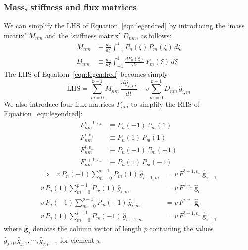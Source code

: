 \documentclass[10pt,a4paper]{article}
\begin{document}
\subsubsection{Mass, stiffness and flux matrices}

We can simplify the LHS of Equation~\ref{eqn:legendred} by introducing the `mass
matrix' $M_{nm}$ and the `stiffness matrix' $D_{nm}$, as follows:
\begin{align*}
M_{nm} & \equiv \frac{dz}{d\xi} \int_{-1}^{1} P_n(\xi) \, P_m(\xi) \, d\xi \\
D_{nm} & \equiv \frac{dz}{d\xi} \int_{-1}^{1} \frac{dP_n(\xi)}{dz} \, P_m(\xi) \, d\xi
\end{align*}
The LHS of Equation~\ref{eqn:legendred} becomes simply
\[
\mbox{LHS} = \sum_{m=0}^{p-1} M_{nm} \, \frac{d\hat{g}_{i,m}}{dt} - v \sum_{m=0}^{p-1}
D_{nm} \, \hat{g}_{i,m}
\]
We also introduce four flux matrices $F_{nm}$ to simplify the RHS
of Equation~\ref{eqn:legendred}:
\begin{align*}
F_{nm}^{i-1,v_+} & \equiv P_n(-1) \, P_m(1) \\
F_{nm}^{i,v_+} & \equiv P_n(1) \, P_m(1) \\
F_{nm}^{i,v_-} & \equiv P_n(-1) \, P_m(-1) \\
F_{nm}^{i+1,v_-} & \equiv P_n(1) \, P_m(-1)
\end{align*}
\begin{align*}
\Longrightarrow \;\;\;
v \, P_n(-1) \sum_{m=0}^{p-1} P_m(1) \, \hat{g}_{i-1,m} & = v \, F^{i-1,v_+} \,
\hat{\mathbf{g}}_{i-1} \\
v \, P_n(1) \sum_{m=0}^{p-1} P_m(1) \, \hat{g}_{i,m} & = v \, F^{i,v_+} \,
\hat{\mathbf{g}}_{i} \\
v \, P_n(-1) \sum_{m=0}^{p-1} P_m(-1) \, \hat{g}_{i,m} & = v \, F^{i,v_-} \,
\hat{\mathbf{g}}_{i} \\
v \, P_n(1) \sum_{m=0}^{p-1} P_m(-1) \, \hat{g}_{i+1,m} & = v \, F^{i+1,v_-} \,
\hat{\mathbf{g}}_{i+1}
\end{align*}
where $\hat{\mathbf{g}}_j$ denotes the column vector of length $p$ containing
the values $\hat{g}_{j,0}, \hat{g}_{j,1}, \cdots, \hat{g}_{j,p-1}$ for element $j$.
\end{document}
